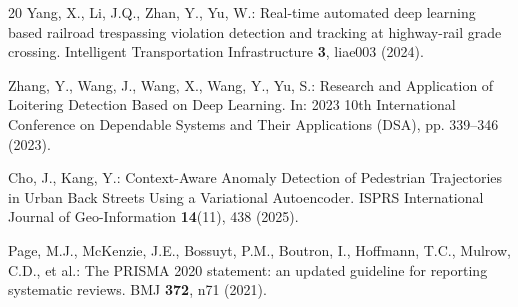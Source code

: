\documentclass[runningheads]{llncs}
\begin{document}
\begin{thebibliography}{20}
Yang, X., Li, J.Q., Zhan, Y., Yu, W.: Real-time automated deep learning based railroad trespassing violation detection and tracking at highway-rail grade crossing. Intelligent Transportation Infrastructure \textbf{3}, liae003 (2024). 

Zhang, Y., Wang, J., Wang, X., Wang, Y., Yu, S.: Research and Application of Loitering Detection Based on Deep Learning. In: 2023 10th International Conference on Dependable Systems and Their Applications (DSA), pp. 339--346 (2023). 

Cho, J., Kang, Y.: Context-Aware Anomaly Detection of Pedestrian Trajectories in Urban Back Streets Using a Variational Autoencoder. ISPRS International Journal of Geo-Information \textbf{14}(11), 438 (2025). 

Page, M.J., McKenzie, J.E., Bossuyt, P.M., Boutron, I., Hoffmann, T.C., Mulrow, C.D., et al.: The PRISMA 2020 statement: an updated guideline for reporting systematic reviews. BMJ \textbf{372}, n71 (2021). 

\end{thebibliography}
\end{document}
